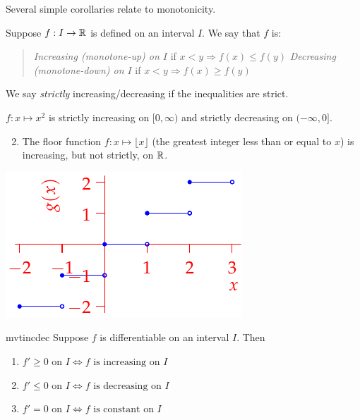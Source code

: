  Several simple corollaries relate to monotonicity.

\begin{defn}{}{}
	Suppose $f:I\to\mathbb{R}$ is defined on an interval $I$. We say that $f$ is:\vspace{-3pt}
	\begin{quote}\itemsep0pt
	  \emph{Increasing (monotone-up) on $I$} if $x<y\Longrightarrow f(x)\le f(y)$\smallbreak
	  \emph{Decreasing (monotone-down) on $I$} if $x<y\Longrightarrow f(x)\ge f(y)$
	\end{quote}
	\vspace{-3pt}
	We say \emph{strictly} increasing/decreasing if the inequalities are strict.
\end{defn}

\begin{examples}[lower separated=false, sidebyside, sidebyside align=top seam, sidebyside gap=0pt, righthand width=0.4\linewidth]{}{}
	\exstart $f:x\mapsto x^2$ is strictly increasing on $[0,\infty)$ and strictly decreasing on $(-\infty,0]$.
	\begin{enumerate}\setcounter{enumi}{1}
		\item The floor function $f:x\mapsto \lfloor x\rfloor$ (the greatest integer less than or equal to $x$) is increasing, but not strictly, on $\mathbb{R}$.
	\end{enumerate}
	\tcblower
  \flushright\includegraphics[scale=0.95]{mvt-floor}
\end{examples}

\begin{cor}{}{mvtincdec}
	Suppose $f$ is differentiable on an interval $I$. Then
	\begin{enumerate}
	  \item $f'\ge 0\text{ on }I\iff f\text{ is increasing on }I$
	  \item $f'\le 0\text{ on }I\iff f\text{ is decreasing on }I$
	  \item $f'=0\text{ on }I\iff f\text{ is constant on }I$
	\end{enumerate}
\end{cor}

